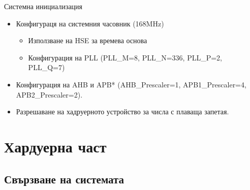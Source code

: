 \documentclass[handout]{beamer}
\begin{document}
\begin{frame}[t]
	\begin{block}{Системна инициализация}
		\begin{itemize}
			\item Конфигураця на системния часовник (168MHz)
			\begin{itemize}
				\item Използване на HSE за времева основа
				\item Конфигурация на PLL (PLL\_M=8, PLL\_N=336, PLL\_P=2, PLL\_Q=7)
			\end{itemize}
			\item Конфигурация на AHB и APB*  (AHB\_Prescaler=1, APB1\_Prescaler=4, APB2\_Prescaler=2).
			\item Разрешаване на хадруерното устройство за числа с плаваща запетая.
		\end{itemize}
	\end{block}

\end{frame}


\section{Хардуерна част}

\subsection{Свързване на системата}
\end{document}
